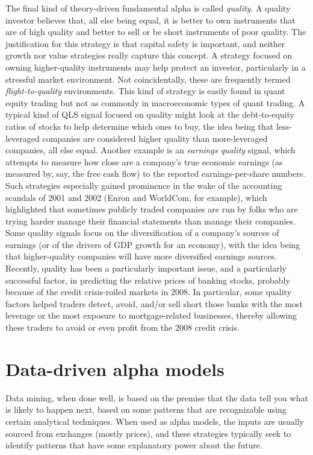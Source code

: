 \documentclass[11pt]{report}
\begin{document}
					The final kind of theory-driven fundamental alpha is called \textit{quality}. A quality investor believes that, all else being equal, it is better to own instruments that are of high quality and better to sell or be short instruments of poor quality. The justification for this strategy is that capital safety is important, and neither growth nor value strategies really capture this concept. A strategy focused on owning higher-quality instruments may help protect an investor, particularly in a stressful market environment. Not coincidentally, these are frequently termed \textit{flight-to-quality} environments. This kind of strategy is easily found in quant equity trading but not as commonly in macroeconomic types of quant trading. A typical kind of QLS signal focused on quality might look at the debt-to-equity ratios of stocks to help determine which ones to buy, the idea being that less-leveraged companies are considered higher quality than more-leveraged companies, all else equal. Another example is an \textit{earnings quality} signal, which attempts to measure how close are a company's true economic earnings (as measured by, say, the free cash flow) to the reported earnings-per-share numbers. Such strategies especially gained prominence in the wake of the accounting scandals of 2001 and 2002 (Enron and WorldCom, for example), which highlighted that sometimes publicly traded companies are run by folks who are trying harder manage their financial statements than manage their companies. Some quality signals focus on the diversification of a company's sources of earnings (or of the drivers of GDP growth for an economy), with the idea being that higher-quality companies will have more diversified earnings sources. Recently, quality has been a particularly important issue, and a particularly successful factor, in predicting the relative prices of banking stocks, probably because of the credit crisis-roiled markets in 2008. In particular, some quality factors helped traders detect, avoid, and/or sell short those banks with the most leverage or the most exposure to mortgage-related businesses, thereby allowing these traders to avoid or even profit from the 2008 credit crisis.

		\section{Data-driven alpha models}

			Data mining, when done well, is based on the premise that the data tell you what is likely to happen next, based on some patterns that are recognizable using certain analytical techniques. When used as alpha models, the inputs are usually sourced from exchanges (mostly prices), and these strategies typically seek to identify patterns that have some explanatory power about the future.
\end{document}
